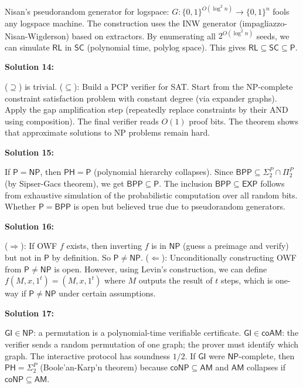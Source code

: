 \documentclass[12pt,a4paper]{exam}
\begin{document}
Nisan's pseudorandom generator for logspace: $G: \{0,1\}^{O(\log^2 n)} \to \{0,1\}^{n}$ fools any logspace machine. The construction uses the INW generator (impagliazzo-Nisan-Wigderson) based on extractors. By enumerating all $2^{O(\log^2 n)}$ seeds, we can simulate $\mathsf{RL}$ in $\mathsf{SC}$ (polynomial time, polylog space). This gives $\mathsf{RL} \subseteq \mathsf{SC} \subseteq \mathsf{P}$.

\vspace{0.5cm}

\textbf{Solution 14:}

($\supseteq$) is trivial. ($\subseteq$): Build a PCP verifier for SAT. Start from the NP-complete constraint satisfaction problem with constant degree (via expander graphs). Apply the gap amplification step (repeatedly replace constraints by their AND using composition). The final verifier reads $O(1)$ proof bits. The theorem shows that approximate solutions to NP problems remain hard.

\vspace{0.5cm}

\textbf{Solution 15:}

If $\mathsf{P} = \mathsf{NP}$, then $\mathsf{PH} = \mathsf{P}$ (polynomial hierarchy collapses). Since $\mathsf{BPP} \subseteq \Sigma_2^P \cap \Pi_2^P$ (by Sipser-Gacs theorem), we get $\mathsf{BPP} \subseteq \mathsf{P}$. The inclusion $\mathsf{BPP} \subseteq \mathsf{EXP}$ follows from exhaustive simulation of the probabilistic computation over all random bits. Whether $\mathsf{P} = \mathsf{BPP}$ is open but believed true due to pseudorandom generators.

\vspace{0.5cm}

\textbf{Solution 16:}

($\Rightarrow$): If OWF $f$ exists, then inverting $f$ is in $\mathsf{NP}$ (guess a preimage and verify) but not in $\mathsf{P}$ by definition. So $\mathsf{P} \neq \mathsf{NP}$. ($\Leftarrow$): Unconditionally constructing OWF from $\mathsf{P} \neq \mathsf{NP}$ is open. However, using Levin's construction, we can define $f(M,x,1^t) = (M,x,1^t)$ where $M$ outputs the result of $t$ steps, which is one-way if $\mathsf{P} \neq \mathsf{NP}$ under certain assumptions.

\vspace{0.5cm}

\textbf{Solution 17:}

$\mathsf{GI} \in \mathsf{NP}$: a permutation is a polynomial-time verifiable certificate. $\mathsf{GI} \in \mathsf{coAM}$: the verifier sends a random permutation of one graph; the prover must identify which graph. The interactive protocol has soundness $1/2$. If $\mathsf{GI}$ were $\mathsf{NP}$-complete, then $\mathsf{PH} = \Sigma_2^P$ (Boole'an-Karp'n theorem) because $\mathsf{coNP} \subseteq \mathsf{AM}$ and $\mathsf{AM}$ collapses if $\mathsf{coNP} \subseteq \mathsf{AM}$.
\end{document}
